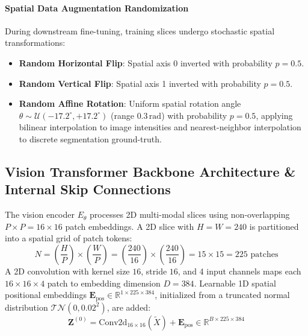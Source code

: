 \documentclass{article}
\begin{document}
\paragraph{Spatial Data Augmentation Randomization}
During downstream fine-tuning, training slices undergo stochastic spatial transformations:
\begin{itemize}
    \item \textbf{Random Horizontal Flip}: Spatial axis 0 inverted with probability $p = 0.5$.
    \item \textbf{Random Vertical Flip}: Spatial axis 1 inverted with probability $p = 0.5$.
    \item \textbf{Random Affine Rotation}: Uniform spatial rotation angle $\theta \sim \mathcal{U}(-17.2^\circ, +17.2^\circ)$ (range $0.3\,\text{rad}$) with probability $p = 0.5$, applying bilinear interpolation to image intensities and nearest-neighbor interpolation to discrete segmentation ground-truth.
\end{itemize}

\subsection{Vision Transformer Backbone Architecture \& Internal Skip Connections}

The vision encoder $E_\theta$ processes 2D multi-modal slices using non-overlapping $P \times P = 16 \times 16$ patch embeddings. A 2D slice with $H=W=240$ is partitioned into a spatial grid of patch tokens:
\begin{equation}
    N = \left(\frac{H}{P}\right) \times \left(\frac{W}{P}\right) = \left(\frac{240}{16}\right) \times \left(\frac{240}{16}\right) = 15 \times 15 = 225 \text{ patches}
\end{equation}
A 2D convolution with kernel size $16$, stride $16$, and 4 input channels maps each $16 \times 16 \times 4$ patch to embedding dimension $D = 384$. Learnable 1D spatial positional embeddings $\mathbf{E}_{\text{pos}} \in \mathbb{R}^{1 \times 225 \times 384}$, initialized from a truncated normal distribution $\mathcal{TN}(0, 0.02^2)$, are added:
\begin{equation}
    \mathbf{Z}^{(0)} = \text{Conv2d}_{16\times16}(\tilde{X}) + \mathbf{E}_{\text{pos}} \in \mathbb{R}^{B \times 225 \times 384}
\end{equation}
\end{document}

